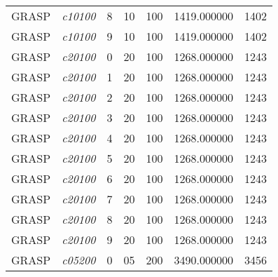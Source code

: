 {\begin{longtable}{cc|c|cc|cc}
			GRASP              & \textit{c10100}    & 8                               & 10               & 100              & 1419.000000                          & 1402 \\ 
			GRASP              & \textit{c10100}    & 9                               & 10               & 100              & 1419.000000                          & 1402 \\ \hline
			GRASP              & \textit{c20100}    & 0                               & 20               & 100              & 1268.000000                          & 1243 \\ 
			GRASP              & \textit{c20100}    & 1                               & 20               & 100              & 1268.000000                          & 1243 \\ 
			GRASP              & \textit{c20100}    & 2                               & 20               & 100              & 1268.000000                          & 1243 \\ 
			GRASP              & \textit{c20100}    & 3                               & 20               & 100              & 1268.000000                          & 1243 \\ 
			GRASP              & \textit{c20100}    & 4                               & 20               & 100              & 1268.000000                          & 1243 \\ 
			GRASP              & \textit{c20100}    & 5                               & 20               & 100              & 1268.000000                          & 1243 \\ 
			GRASP              & \textit{c20100}    & 6                               & 20               & 100              & 1268.000000                          & 1243 \\ 
			GRASP              & \textit{c20100}    & 7                               & 20               & 100              & 1268.000000                          & 1243 \\ 
			GRASP              & \textit{c20100}    & 8                               & 20               & 100              & 1268.000000                          & 1243 \\ 
			GRASP              & \textit{c20100}    & 9                               & 20               & 100              & 1268.000000                          & 1243 \\ \hline
			GRASP              & \textit{c05200}    & 0                               & 05               & 200              & 3490.000000                          & 3456 \\ 

\end{longtable}}
